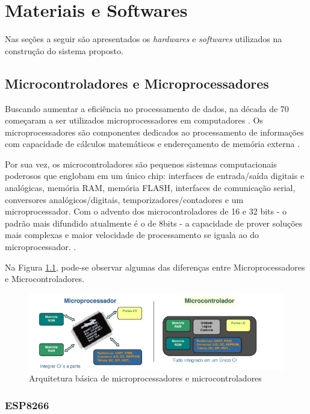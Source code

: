 \chapter{Materiais e Softwares}
Nas seções a seguir são apresentados os \textit{hardwares} e \textit{softwares} utilizados na construção do sistema proposto.
\section{Microcontroladores e Microprocessadores}

Buscando aumentar a eficiência no processamento de dados, na década de 70
começaram a ser utilizados microprocessadores em computadores \cite{martins2005sistemas}. Os microprocessadores são componentes dedicados ao processamento de informações com
capacidade de cálculos matemáticos e endereçamento de memória externa \cite{chase2007sistemas}.

Por sua vez, os microcontroladores são pequenos sistemas computacionais poderosos que englobam em um único chip: interfaces de entrada/saída digitais e analógicas, memória RAM, memória FLASH, interfaces de comunicação serial, conversores analógicos/digitais, temporizadores/contadores e um microprocessador. Com o advento dos microcontroladores de 16 e 32 bits - o padrão mais difundido atualmente é o de 8bits - a capacidade de prover soluções mais complexas e maior velocidade de processamento se iguala ao do microprocessador. \cite{chase2007sistemas}.

Na Figura \ref{fig:microprocessador-microcontrolador}, pode-se observar algumas das diferenças entre Microprocessadores e Microcontroladores.

\begin{figure}[htbp]
	\centering
	\includegraphics[scale=0.7]{figuras/processa-controla.png}
	\caption{Arquitetura básica de microprocessadores e microcontroladores}
	\label{fig:microprocessador-microcontrolador}
\end{figure}

\subsection{ESP8266}


